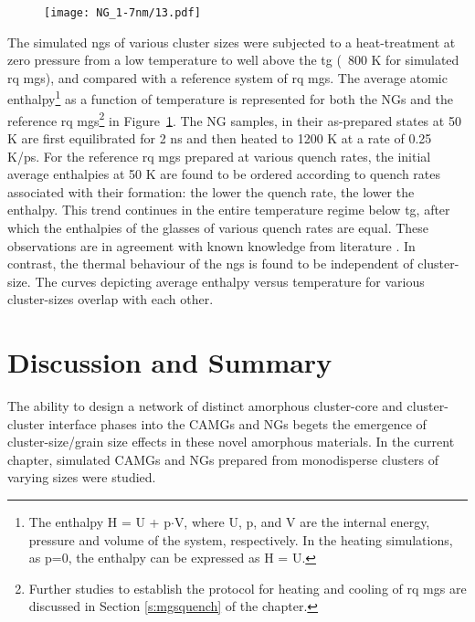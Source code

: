 \begin{figure}[!h]
	\texttt{[image: NG\_1-7nm/13.pdf]}
	\label{f:NG_enth}
\end{figure}

The simulated \gls{ng}s of various cluster sizes were subjected to a heat-treatment at zero pressure from a low temperature to well above the \gls{tg} (~800 K for simulated \cz \gls{rq} \gls{mg}s), and compared with a reference system of \gls{rq} \gls{mg}s. The average atomic enthalpy\footnote{The enthalpy H = U + p$\cdot$V, where U, p, and V are the internal energy, pressure and volume of the system, respectively. In the heating simulations, as p=0, the enthalpy can be expressed as H = U.} as a function of temperature is represented for both the NGs and the reference \cz \gls{rq} \gls{mg}s\footnote{Further studies to establish the protocol for heating and cooling of \gls{rq} \gls{mg}s are discussed in Section \ref{s:mgsquench} of the  chapter.} in Figure~\ref{f:NG_enth}. The NG samples, in their as-prepared states at 50 K are first equilibrated for 2 ns and then heated to 1200 K at a rate of 0.25 K/ps. For the reference \gls{rq} \gls{mg}s prepared at various quench rates, the initial average enthalpies at 50 K are found to be ordered according to quench rates associated with their formation: the lower the quench rate, the lower the enthalpy. This trend continues in the entire temperature regime below \gls{tg}, after which the enthalpies of the glasses of various quench rates are equal. These observations are in agreement with known knowledge from literature \cite{Berthier2016,Ediger1996}. In contrast, the thermal behaviour of the \gls{ng}s is found to be independent of cluster-size. The curves depicting average enthalpy versus temperature for various cluster-sizes overlap with each other. \par

\section{Discussion and Summary}
The ability to design a network of distinct amorphous cluster-core and cluster-cluster interface phases into the CAMGs and NGs begets the emergence of cluster-size/grain size effects in these novel amorphous materials. In the current chapter, simulated \cz CAMGs and NGs prepared from monodisperse clusters of varying sizes were studied. \par

